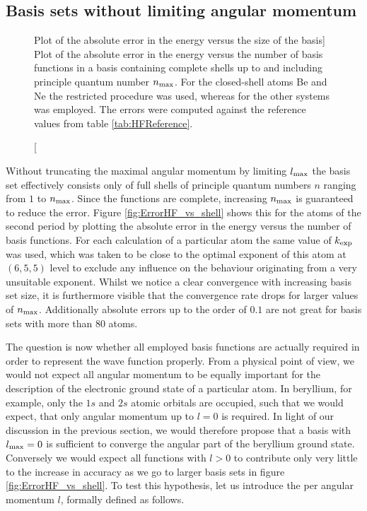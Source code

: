 %
%
\subsection{Basis sets without limiting angular momentum}
\begin{figure}
	\centering
	\caption
	[Plot of the absolute error in the \HF energy versus the size of the \CS basis]
	{
		Plot of the absolute error in the \HF energy versus the number of basis
		functions in a \CS basis containing complete shells
		up to and including principle quantum number $n_\text{max}$.
		For the closed-shell atoms Be and Ne
		the restricted \HF procedure was used,
		whereas for the other systems \UHF was employed.
		The errors were computed against the reference
		values from table \vref{tab:HFReference}.
}
	\label{fig:ErrorHF_vs_shell}
\end{figure}
Without truncating the maximal angular momentum by limiting $l_\text{max}$
the \CS basis set effectively consists only of full shells
of principle quantum numbers $n$ ranging from $1$ to $n_\text{max}$.
Since the \CS functions are complete, increasing $n_\text{max}$ is guaranteed
to reduce the error.
Figure \vref{fig:ErrorHF_vs_shell} shows this for the atoms of the second period
by plotting the absolute error in the \HF energy
versus the number of basis functions.
For each calculation of a particular atom the same value of $k_\text{exp}$ was used,
which was taken to be close to the optimal exponent of this atom at $(6,5,5)$ level
to exclude any influence on the behaviour originating from a
very unsuitable exponent.
Whilst we notice a clear convergence with increasing basis set size,
it is furthermore visible that the convergence rate drops
for larger values of $n_\text{max}$.
Additionally absolute errors up to the order of $0.1$ are not great
for basis sets with more than $80$ atoms.

The question is now whether all employed
basis functions are actually required
in order to represent the wave function properly.
From a physical point of view,
we would not expect all angular momentum to be equally important
for the description of the electronic ground state of a particular atom.
In beryllium, for example, only the $1s$ and $2s$ atomic orbitals are occupied,
such that we would expect, that only angular momentum up to $l = 0$ is required.
In light of our discussion in the previous section,
we would therefore propose that a basis with $l_\text{max} = 0$ is sufficient
to converge the angular part of the beryllium ground state.
Conversely we would expect all \CS functions with $l > 0$
to contribute only very little to the increase in accuracy
as we go to larger basis sets in figure \vref{fig:ErrorHF_vs_shell}.
To test this hypothesis, let us introduce the
 per angular momentum $l$,
formally defined as follows.

